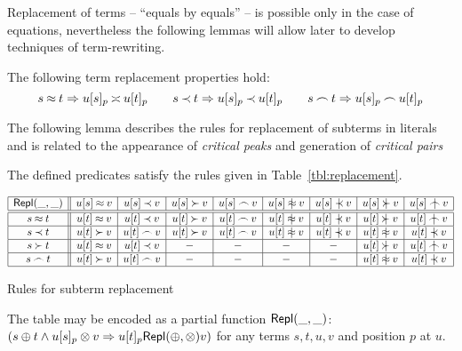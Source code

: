 Replacement of terms --
``equals by equals'' -- is possible only in the case of equations, nevertheless
the following lemmas will allow later to develop techniques of term-rewriting.
%
\begin{lemma}\label{le:replacement}
The following term replacement properties hold: %
\begin{equation}\label{eq:rep}
s\Eq t  \impl   u[s]_p \Seteq  u[t]_p\ \ \ \ \ \ 
s\Incl t  \impl  u[s]_p \Incl  u[t]_p\ \ \ \ \ \  
s\Int t \impl  u[s]_p \Int  u[t]_p  
\end{equation}
\end{lemma}
%
The following lemma describes  the rules for replacement of
subterms in literals and is related to the appearance of
{\em critical peaks} \cite{Der} and generation of {\em
critical pairs}
%
\begin{lemma} \label{le:replacement-in-atoms}
The defined predicates satisfy the rules
given in Table~\ref {tbl:replacement}.
\begin{table}[hbt]
\[\begin{array}{|c||c|c|c|c|c|c|c|c|}
\hline
 \Repl\_\_   & u[s]\Eq v   & u[s]\Incl v & u[s]\Cont v & u[s]\Int v & u[s]\notEq v & u[s]\notIncl v & u[s]\notCont v & u[s]\notInt v\\
\hline
\hline
s\Eq t   & u[t]\Eq v   & u[t]\Incl v & u[t]\Cont v & u[t]\Int v & u[t]\notEq v & u[t]\notIncl v & u[t]\notCont v & u[t]\notInt v\\
\hline
s\Incl t & u[t]\Cont v & u[t]\Int v  & u[t]\Cont v & u[t]\Int v & u[t]\notEq v & u[t]\notIncl v & u[t]\notEq v   & u[t]\notIncl v \\
\hline
s\Cont t & u[t]\Eq v   & u[t]\Incl v & -           & -          & -            & -              & u[t]\notCont v & u[t]\notInt v \\
\hline
s\Int t  & u[t]\Cont v & u[t]\Int v  & -           & -          & -            & -              & u[t]\notEq v   & u[t]\notIncl v \\
\hline 
\end{array}\]
\caption{Rules for subterm replacement} \label{tbl:replacement}
\end{table}
\end{lemma}

The table may be encoded as a partial function \(\mbox {\sf Repl}(\_,\_)\): \((s\oplus t\land u[s]_p\otimes v\mathrel\Rightarrow u[t]_p \mbox {\sf Repl}(\oplus,\otimes)
v)\) for any terms $s,t,u,v$ and position $p$ at $u$.  

